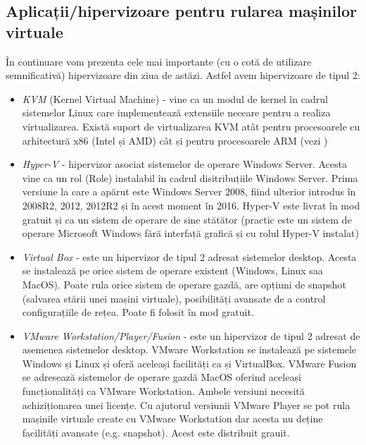 \subsection{Aplicații/hipervizoare pentru rularea mașinilor virtuale}
\label{sec:vm-intro-apps}

În continuare vom prezenta cele mai importante (cu o cotă de utilizare
semnificativă) hipervizoare din ziua de astăzi. Astfel avem hipervizoare de
tipul 2:

\begin{itemize}
	\item \textit{KVM}  (Kernel Virtual
		Machine) - vine ca un modul de kernel în cadrul sistemelor Linux
		care implementează extensiile neceare pentru a realiza
		virtualizarea. Există suport de virtualizarea KVM atât pentru
		procesoarele cu arhitectură x86 (Intel și AMD) cât și pentru
		procesoarele ARM (vezi
		)
	\item \textit{Hyper-V} - hipervizor asociat sistemelor de operare
		Windows Server. Acesta vine ca un rol (Role) instalabil în
		cadrul disitribuțiile Windows Server. Prima versiune la care a
		apărut este Windows Server 2008, fiind ulterior introdus în
		2008R2, 2012, 2012R2 și în acest moment în 2016. Hyper-V este
		livrat în mod gratuit și ca un sistem de operare de sine
		stătător (practic este un sistem de operare Microsoft Windows
		fără interfață grafică și cu rolul Hyper-V instalat)
	\item \textit{Virtual Box} - este un hipervizor de tipul 2 adresat
		sistemelor desktop. Acesta se instalează pe orice sistem de
		operare existent (Windows, Linux saa MacOS). Poate rula orice
		sistem de operare gazdă, are opțiuni de snapshot (salvarea
		stării unei mașini virtuale), posibilități avansate de a control
		configurațiile de rețea. Poate fi folosit în mod gratuit.
	\item \textit{VMware Workstation/Player/Fusion} - este un hipervizor de
		tipul 2 adresat de asemenea sistemelor desktop. VMware
		Workstation se instalează pe sistemele Windows și Linux și oferă
		aceleași facilități ca și VirtualBox. VMware Fusion se adresează
		sistemelor de operare gazdă MacOS oferind aceleași
		funcționalități ca VMware Workstation. Ambele versiuni necesită
		achiziționarea unei licențe. Cu ajutorul versiunii VMware Player
		se pot rula mașinile virtuale create cu VMware Workstation dar
		acesta nu deține facilități avansate (e.g. snapshot). Acest este
		distribuit grauit.
\end{itemize}

